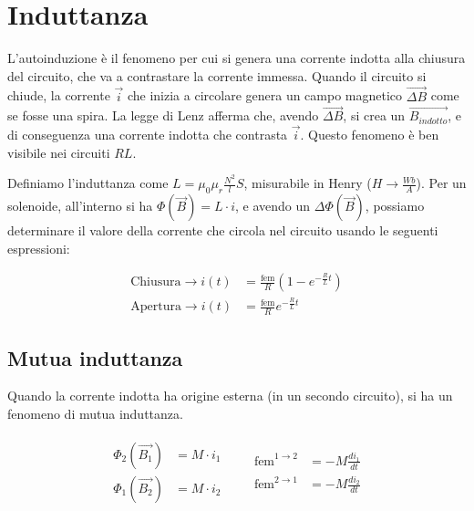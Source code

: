
\section{Induttanza}

L'autoinduzione è il fenomeno per cui si genera una corrente indotta alla chiusura del circuito, che va a contrastare la corrente immessa.
Quando il circuito si chiude, la corrente $\vec{i}$ che inizia a circolare genera un campo magnetico $\vec{\Delta B}$ come se fosse una spira.
La legge di Lenz afferma che, avendo $\vec{\Delta B}$, si crea un $\vec{B_{indotto}}$, e di conseguenza una corrente indotta che contrasta $\vec{i}$.
Questo fenomeno è ben visibile nei circuiti $RL$.

Definiamo l'induttanza come $L = \mu_0 \mu_r \frac{N^2}{l} S$, misurabile in Henry ($H \rightarrow \frac{Wb}{A}$). Per un solenoide, all'interno si ha $\Phi(\vec{B}) = L \cdot i$, e avendo un $\Delta \Phi(\vec{B})$, possiamo determinare il valore della corrente che circola nel circuito usando le seguenti espressioni:

\begin{align*}
    \text{Chiusura} \rightarrow i(t) & = \frac{\text{fem}}{R} \left( 1 - e^{-\frac{R}{L} t} \right) \\
    \text{Apertura} \rightarrow i(t) & = \frac{\text{fem}}{R} e^{-\frac{R}{L} t}
\end{align*}


\subsection{Mutua induttanza}

Quando la corrente indotta ha origine esterna (in un secondo circuito), si ha un fenomeno di mutua induttanza.

\begin{align*}
    \begin{aligned}
        \Phi_2(\vec{B_1}) & = M \cdot i_1 \\
        \Phi_1(\vec{B_2}) & = M \cdot i_2
    \end{aligned}
    \quad &
    \begin{aligned}
        \text{fem}^{1 \rightarrow 2} & = - M \frac{d i_1}{d t} \\
        \text{fem}^{2 \rightarrow 1} & = - M \frac{d i_2}{d t}
    \end{aligned}
\end{align*}

